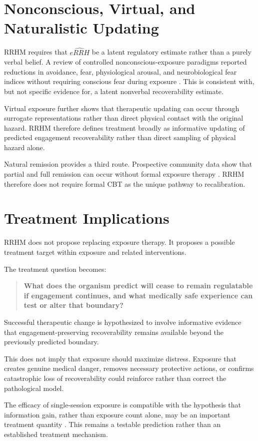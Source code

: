 \documentclass[9pt,twocolumn]{article}
\begin{document}
\section{Nonconscious, Virtual, and Naturalistic Updating}
RRHM requires that $\widehat{eRRH}$ be a latent regulatory estimate rather than a purely verbal belief. A review of controlled nonconscious-exposure paradigms reported reductions in avoidance, fear, physiological arousal, and neurobiological fear indices without requiring conscious fear during exposure \cite{siegel2025}. This is consistent with, but not specific evidence for, a latent nonverbal recoverability estimate.

Virtual exposure further shows that therapeutic updating can occur through surrogate representations rather than direct physical contact with the original hazard. RRHM therefore defines treatment broadly as informative updating of predicted engagement recoverability rather than direct sampling of physical hazard alone.

Natural remission provides a third route. Prospective community data show that partial and full remission can occur without formal exposure therapy \cite{trumpf2009remission}. RRHM therefore does not require formal CBT as the unique pathway to recalibration.

\section{Treatment Implications}
RRHM does not propose replacing exposure therapy. It proposes a possible treatment target within exposure and related interventions.

The treatment question becomes:
\begin{quote}
\textbf{What does the organism predict will cease to remain regulatable if engagement continues, and what medically safe experience can test or alter that boundary?}
\end{quote}

Successful therapeutic change is hypothesized to involve informative evidence that engagement-preserving recoverability remains available beyond the previously predicted boundary.

This does not imply that exposure should maximize distress. Exposure that creates genuine medical danger, removes necessary protective actions, or confirms catastrophic loss of recoverability could reinforce rather than correct the pathological model.

The efficacy of single-session exposure is compatible with the hypothesis that information gain, rather than exposure count alone, may be an important treatment quantity \cite{odgers2022}. This remains a testable prediction rather than an established treatment mechanism.
\end{document}
